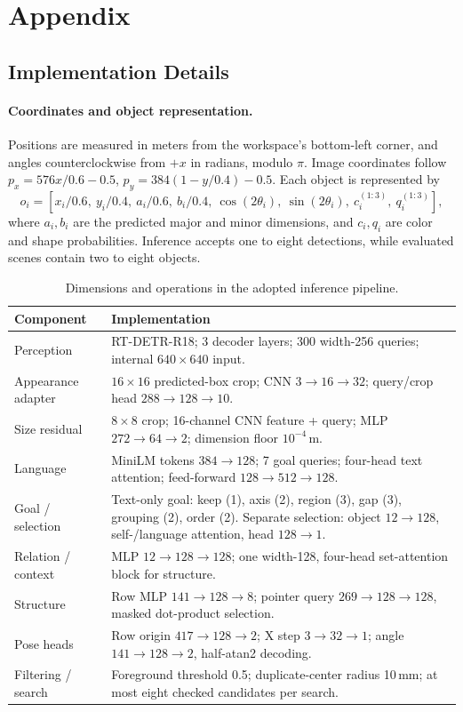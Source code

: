 \section{Appendix}
\subsection{Implementation Details}
\label{app:implementation}
\paragraph{Coordinates and object representation.}
Positions are measured in meters from the workspace's bottom-left corner, and angles counterclockwise from $+x$ in radians, modulo $\pi$. Image coordinates follow $p_x=576x/0.6-0.5$, $p_y=384(1-y/0.4)-0.5$. Each object is represented by
\begin{equation}
 o_i=[x_i/0.6,\ y_i/0.4,\ a_i/0.6,\ b_i/0.4,\ \cos(2\theta_i),\ \sin(2\theta_i),\ c_i^{(1:3)},\ q_i^{(1:3)}],
\end{equation}
where $a_i,b_i$ are the predicted major and minor dimensions, and $c_i,q_i$ are color and shape probabilities. Inference accepts one to eight detections, while evaluated scenes contain two to eight objects.

\begin{table}[H]
\centering\small
\caption{Dimensions and operations in the adopted inference pipeline.}
\begin{tabularx}{\linewidth}{@{}lY@{}}\toprule
\textbf{Component} & \textbf{Implementation} \\\midrule
Perception & RT-DETR-R18; 3 decoder layers; 300 width-256 queries; internal $640\times640$ input. \\
Appearance adapter & $16\times16$ predicted-box crop; CNN $3\to16\to32$; query/crop head $288\to128\to10$. \\
Size residual & $8\times8$ crop; 16-channel CNN feature + query; MLP $272\to64\to2$; dimension floor $10^{-4}$\,m. \\
Language & MiniLM tokens $384\to128$; 7 goal queries; four-head text attention; feed-forward $128\to512\to128$. \\
Goal / selection & Text-only goal: keep (1), axis (2), region (3), gap (3), grouping (2), order (2). Separate selection: object $12\to128$, self-/language attention, head $128\to1$. \\
Relation / context & MLP $12\to128\to128$; one width-128, four-head set-attention block for structure. \\
Structure & Row MLP $141\to128\to8$; pointer query $269\to128\to128$, masked dot-product selection. \\
Pose heads & Row origin $417\to128\to2$; X step $3\to32\to1$; angle $141\to128\to2$, half-atan2 decoding. \\
Filtering / search & Foreground threshold 0.5; duplicate-center radius 10\,mm; at most eight checked candidates per search. \\\bottomrule
\end{tabularx}
\end{table}

